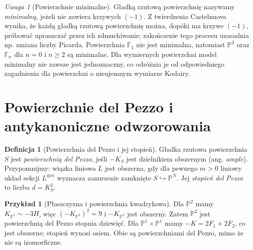 \documentclass[11pt,a4paper,openany]{report}
\numberwithin{equation}{section}
\theoremstyle{plain}
\theoremstyle{definition}
\newtheorem{definicja}[twierdzenie]{Definicja}
\newtheorem{przyklad}[twierdzenie]{Przykład}
\theoremstyle{remark}
\newtheorem{uwaga}[twierdzenie]{Uwaga}
\newcommand{\PP}{\mathbb P}
\begin{document}
\begin{uwaga}[Powierzchnie minimalne]
Gładką rzutową powierzchnię nazywamy \emph{minimalną},
jeżeli nie zawiera krzywych $(-1)$. Z twierdzenia
Castelnuova wynika, że każdą gładką rzutową powierzchnię
można, dopóki ma krzywe $(-1)$, próbować upraszczać
przez ich zdmuchiwanie; zakończenie tego procesu
uzasadnia np. zmiana liczby Picarda. Powierzchnia
$\mathbb F_1$ nie jest minimalna, natomiast
$\PP^2$ oraz $\mathbb F_n$ dla $n=0$ i $n\ge2$
są minimalne. Dla wymiernych powierzchni model minimalny
nie zawsze jest jednoznaczny, co odróżnia je od
odpowiedniego zagadnienia dla powierzchni o nieujemnym
wymiarze Kodairy.
\end{uwaga}

\section{Powierzchnie del Pezzo i antykanoniczne odwzorowania}
\label{sec:ga6-delpezzo}

\begin{definicja}[Powierzchnia del Pezzo i jej stopień]
Gładka rzutowa powierzchnia $S$ jest \emph{powierzchnią
del Pezzo}, jeśli $-K_S$ jest dzielnikiem obszernym
(ang. \emph{ample}). Przypomnijmy: wiązka liniowa $L$
jest obszerna, gdy dla pewnego $m>0$ liniowy układ
sekcji $L^{\otimes m}$ wyznacza zanurzenie zamknięte
$S\hookrightarrow\PP^N$. Jej \emph{stopień del Pezzo}
to liczba $d=K_S^2$.
\end{definicja}

\begin{przyklad}[Płaszczyzna i powierzchnia kwadrykowa]
Dla $\PP^2$ mamy $K_{\PP^2}\sim-3H$,
więc $(-K_{\PP^2})^2=9$ i $-K_{\PP^2}$ jest
obszerny. Zatem $\PP^2$ jest powierzchnią del Pezzo
stopnia dziewięć. Dla $\PP^1\times\PP^1$
mamy $-K=2F_1+2F_2$, co jest obszerne;
stopień wynosi osiem. Obie są powierzchniami
del Pezzo, mimo że nie są izomorficzne.
\end{przyklad}
\end{document}
